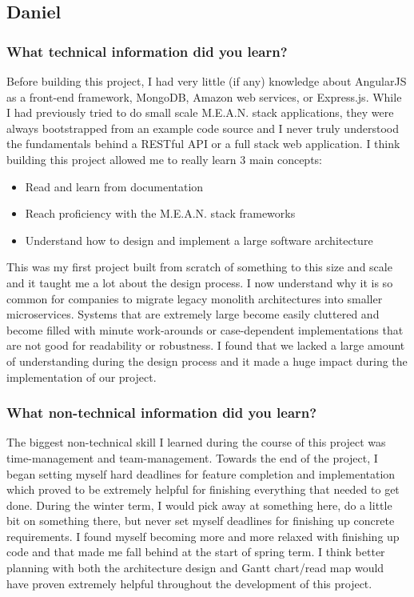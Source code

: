 \documentclass[journal,10pt,onecolumn,compsoc]{IEEEtran}
\begin{document}
    \subsection{Daniel}
    \subsubsection{What technical information did you learn?}    
    Before building this project, I had very little (if any) knowledge about AngularJS as a front-end framework, MongoDB, Amazon web services, or Express.js. While I had previously tried to do small scale M.E.A.N. stack applications, they were always bootstrapped from an example code source and I never truly understood the fundamentals behind a RESTful API or a full stack web application. I think building this project allowed me to really learn 3 main concepts:
    \begin{itemize}
        \item Read and learn from documentation
        \item Reach proficiency with the M.E.A.N. stack frameworks
        \item Understand how to design and implement a large software architecture
    \end{itemize}
    This was my first project built from scratch of something to this size and scale and it taught me a lot about the design process. I now understand why it is so common for companies to migrate legacy monolith architectures into smaller microservices. Systems that are extremely large become easily cluttered and become filled with minute work-arounds or case-dependent implementations that are not good for readability or robustness. I found that we lacked a large amount of understanding during the design process and it made a huge impact during the implementation of our project.
    \subsubsection{What non-technical information did you learn?}
    The biggest non-technical skill I learned during the course of this project was time-management and team-management. Towards the end of the project, I began setting myself hard deadlines for feature completion and implementation which proved to be extremely helpful for finishing everything that needed to get done. During the winter term, I would pick away at something here, do a little bit on something there, but never set myself deadlines for finishing up concrete requirements. I found myself becoming more and more relaxed with finishing up code and that made me fall behind at the start of spring term. I think better planning with both the architecture design and Gantt chart/read map would have proven extremely helpful throughout the development of this project.
\end{document}
